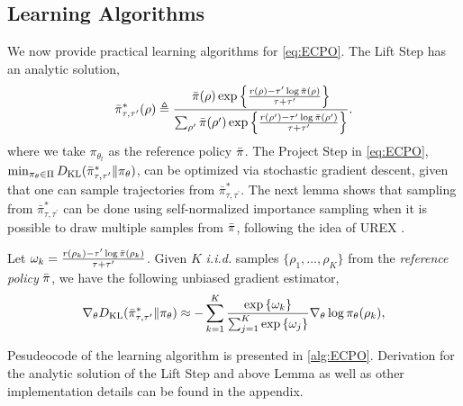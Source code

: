 \subsection{Learning Algorithms}

We now provide practical learning algorithms for \cref{eq:ECPO}.
The Lift Step
has an analytic solution,
{\small
\begin{equation}
	\label{eq:pitautauprime}
	\bar{\pi}_{\tau,\tau^{\prime}}^*(\rho) \triangleq \frac{\bar{\pi}(\rho) \exp\left\{ \frac{r(\rho)-\tau^{\prime} \log \bar{\pi}(\rho) }{ \tau+\tau^{\prime}} \right\}}{ \sum_{\rho^{\prime}}{\bar{\pi}(\rho^{\prime}) \exp\left\{ \frac{r(\rho^{\prime})-\tau^{\prime} \log \bar{\pi}(\rho^{\prime})}{ \tau+\tau^{\prime}} \right\} } }.
\end{equation}
}	
 where we take $\pi_{\theta_t}$ as the reference policy $\bar{\pi}$. The Project Step in \cref{eq:ECPO}, $\min\nolimits_{\pi_\theta \in \Pi}{D_{\mathrm{KL}}( \bar{\pi}_{\tau,\tau^{\prime}}^* \| \pi_\theta ) }$, can be optimized via stochastic gradient descent, given that one can sample trajectories from $\bar{\pi}_{\tau,\tau^{\prime}}^*$. %
The next lemma shows that sampling from $\bar{\pi}_{\tau,\tau^{\prime}}^*$ can be done using self-normalized importance sampling \citep{owen2013monte} when it is possible to draw multiple samples from $\bar{\pi}$, following the idea of UREX \citep{nachum2017improving}.   
\begin{lem}
\label{lem:ECPOgradientestimate}
Let $\omega_k = \frac{r(\rho_k) - \tau^{\prime} \log{\bar{\pi}(\rho_k)} }{\tau + \tau^{\prime}}$. Given $K$ \emph{i.i.d.} samples $\{\rho_1, \dots, \rho_K\}$ from the \emph{reference policy} $\bar{\pi}$, we have the following unbiased gradient estimator,
{\small
\begin{equation}
\label{eq:gradient_estimator}
	\nabla_{\theta} D_{\mathrm{KL}}(\bar{\pi}_{\tau,\tau^{\prime}}^* \| \pi_\theta)\approx -\sum\limits_{k=1}^K{ \frac{ \exp\left\{ \omega_k \right\} }{ \sum_{j=1}^K{ \exp\left\{ \omega_j \right\}}} \nabla_{\theta} \log{\pi_\theta(\rho_k)} },
\end{equation}
}
\end{lem}
Pesudeocode of the learning algorithm is presented in \cref{alg:ECPO}. Derivation for the analytic solution of the Lift Step and above Lemma as well as other implementation details can be found in the appendix.


